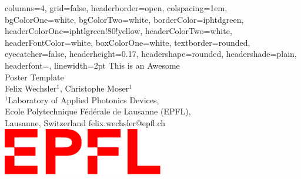 \documentclass[18pt, a0paper,portrait,fontscale=0.25]{baposter}
\begin{document}


\begin{poster}
{
columns=4,
grid=false,
headerborder=open, %
colspacing=1em, %
bgColorOne=white, %
bgColorTwo=white, %
borderColor=iphtdgreen, %
headerColorOne=iphtlgreen!80!yellow, %
headerColorTwo=white, %
headerFontColor=white, %
boxColorOne=white, %
textborder=rounded, %
eyecatcher=false, %
headerheight=0.17\textheight, %
headershape=rounded, %
headershade=plain,
headerfont=\Large \textsf, %
linewidth=2pt %
}
{}
%
%
{
\vspace*{0.7cm}
\textsf %
{\huge This is an Awesome\\[0.3cm] Poster Template 
}
} %
{\sf\vspace{0.2em}\\
\large Felix Wechsler$^{1}$, Christophe Moser$^{1}$
\vspace{0.1em}\\
\small{$^1$Laboratory of Applied Photonics Devices,\\Ecole Polytechnique Fédérale de Lausanne (EPFL),\\ Lausanne, Switzerland
felix.wechsler@epfl.ch\\
}}%
{
    \includegraphics[width=7cm]{figures/logo_EPFL.pdf}
}


\end{poster}
\end{document}
